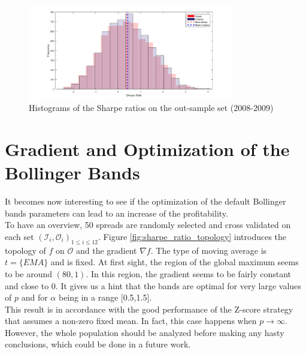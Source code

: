 \documentclass[11pt,a4,twosided,singlespacing,titlepagenumber=on]{scrreprt}
\numberwithin{equation}{chapter} %
\theoremstyle{remark}
\begin{document}
\begin{figure}[H]
\centering
\includegraphics[width = 0.8\textwidth]{res/final_res}
\caption{Histograms of the Sharpe ratios on the out-sample set (2008-2009)}
\label{fig:sr_comparison_2008_2010}
\end{figure}

\section{Gradient and Optimization of the Bollinger Bands}
\label{sec:optimization_bb}

It becomes now interesting to see if the optimization of the default Bollinger bands parameters can lead to an increase of the profitability. \\

To have an overview, 50 spreads are randomly selected and cross validated on each set $(\mathcal{I}_i, \mathcal{O}_i)_{1 \leq i \leq 12}$. Figure \ref{fig:sharpe_ratio_topology} introduces the topology of $f$ on $\mathcal{O}$ and the gradient $\nabla f$. The type of moving average is $t = \{ EMA \}$ and is fixed. At first sight, the region of the global maximum seems to be around $(80,1)$. In this region, the gradient seems to be fairly constant and close to 0. It gives us a hint that the bands are optimal for very large values of $p$ and for $\alpha$ being in a range [0.5,1.5]. \\

This result is in accordance with the good performance of the Z-score strategy that assumes a non-zero fixed mean. In fact, this case happens when $p \rightarrow \infty$. However, the whole population should be analyzed before making any hasty conclusions, which could be done in a future work.
\end{document}
